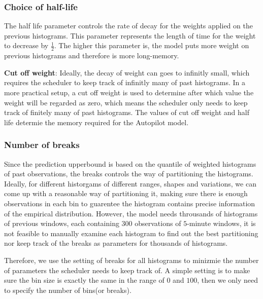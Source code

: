 \documentclass{article}
\begin{document}
\subsubsection{Choice of half-life}

\begin{flushleft}
The half life parameter controls the rate of decay for the weights applied on
the previous histograms. This parameter represents the length of time for the
weight to decrease by $\frac{1}{2}$. The higher this parameter is, the model
puts more weight on previous histograms and therefore is more long-memory.
\end{flushleft}

\begin{flushleft}
\textbf{Cut off weight}: Ideally, the decay of weight can goes to infinitly
small, which requires the scheduler to keep track of infinitly many of past
histograms. In a more practical setup, a cut off weight is used to determine
after which value the weight will be regarded as zero, which means the scheduler
only needs to keep track of finitely many of past histograms. The values of cut
off weight and half life determie the memory required for the Autopilot model.
\end{flushleft}

\begin{flushleft}

\end{flushleft}

\subsubsection{Number of breaks}

\begin{flushleft}
Since the prediction upperbound is based on the quantile of weighted histograms
of past observations, the breaks controls the way of partitioning the
histograms. Ideally, for different historgams of different ranges, shapes and
variations, we can come up with a reasonable way of partitioning it, making sure
there is enough observations in each bin to guarentee the histogram contains
precise information of the empirical distribution. However, the model needs
throusands of histograms of previous windows, each containing $300$ observations
of $5$-minute windows, it is not feasible to manually examine each histogram to
find out the best partitioning nor keep track of the breaks as parameters for
thousands of histograms.

Therefore, we use the setting of breaks for all histograms to minizmie the
number of parameters the scheduler needs to keep track of. A simple setting
is to make sure the bin size is exactly the same in the range of $0$ and $100$,
then we only need to specify the number of bins(or breaks).
\end{flushleft}
\end{document}
